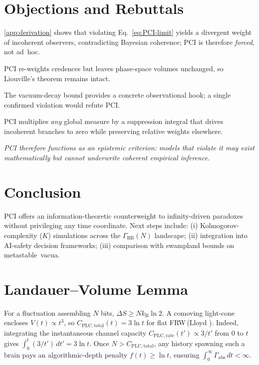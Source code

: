 \documentclass[12pt]{article}
\newcommand{\KB}{k_\mathrm{B}}
\newcommand{\PCI}{PCI\xspace}
\begin{document}
\section{Objections and Rebuttals}\label{sec:objections}

\begin{description}[leftmargin=2.4em,labelsep=0.6em]

\item[Ad~hoc.]%
\autoref{app:derivation} shows that violating
Eq.~\eqref{eq:PCI-limit} yields a divergent weight of incoherent
observers, contradicting Bayesian coherence; \PCI is therefore
\emph{forced}, not ad~hoc.

\item[Liouville concern.]%
\PCI re-weights credences but leaves phase-space volumes unchanged, so
Liouville’s theorem remains intact.

\item[Unfalsifiable.]%
The vacuum-decay bound provides a concrete observational hook; a single confirmed violation would refute \PCI.

\item[Measure objection.]%
\PCI multiplies \emph{any} global measure by a suppression integral that
drives incoherent branches to zero while preserving relative weights
elsewhere.

\end{description}

\medskip\noindent
\emph{PCI therefore functions as an epistemic criterion: models that
violate it may exist mathematically but cannot underwrite coherent
empirical inference.}

\section{Conclusion}\label{sec:conclusion}
\PCI offers an information-theoretic counterweight to infinity-driven paradoxes without privileging any time coordinate. Next steps include:  
(i) Kolmogorov-complexity ($K$) simulations across the $\Gamma_{\text{BB}}(N)$ landscape;  
(ii) integration into AI-safety decision frameworks;  
(iii) comparison with swampland bounds on metastable~vacua.

\appendix
\section{Landauer–Volume Lemma}\label{app:proof}
For a fluctuation assembling $N$ bits, $\Delta S\ge N\KB\ln 2.$
A comoving light-cone encloses $V(t)\propto t^{3}$, so
$C_{\mathrm{PLC,total}}(t)=3\ln t$ for flat FRW\,(Lloyd \cite{lloyd2000}).
Indeed, integrating the instantaneous channel capacity
$C_{\mathrm{PLC,rate}}(t')\propto 3/t'$ from $0$ to $t$ gives
$\int_0^t (3/t')\,dt' = 3\ln t$.
Once $N>C_{\mathrm{PLC,total}}$, any history spawning such a brain pays
an algorithmic-depth penalty $f(t)\ge\ln t$, ensuring
$\int_0^\infty\Gamma_{\text{abs}}\,dt<\infty.$
\end{document}
